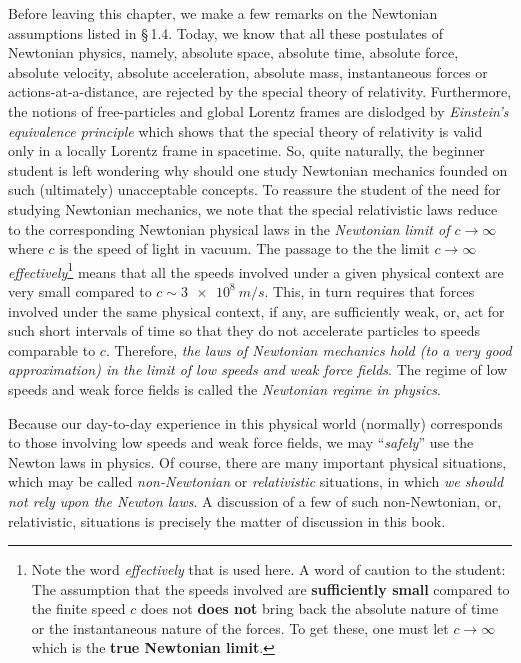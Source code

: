 Before leaving this chapter, we make a few remarks on 
the
Newtonian assumptions listed in \S\,1.4. Today, we know 
that
all these postulates of Newtonian physics, namely, 
absolute
space, absolute time, absolute force, absolute 
velocity,
absolute acceleration, absolute mass, instantaneous 
forces
or actions-at-a-distance, are rejected by the special 
theory
of relativity. Furthermore, the notions of 
free-particles
and global Lorentz frames are dislodged by
\textsl{Einstein's equivalence principle} which shows 
that
the special theory of relativity is valid only in a 
locally
Lorentz frame in spacetime. So, quite naturally, the 
beginner student is left wondering why should one 
study 
Newtonian mechanics  founded on such (ultimately) 
unacceptable concepts. To reassure the student of the 
need 
for studying Newtonian mechanics, we note that the 
special 
relativistic laws reduce to the corresponding 
Newtonian 
physical laws in the \textsl{Newtonian limit of 
$c\rightarrow \infty$ } where $c$ is the speed of light 
in 
vacuum. The passage to the the limit $c\rightarrow 
\infty$ 
\textsl{effectively}\footnote{Note the word 
\textsl{effectively} that is used here. A word of 
caution to
the student: The assumption that the speeds involved 
are
\textbf{sufficiently small} compared to the finite 
speed
$c$ does not \textbf{does not} bring back the absolute 
nature of time or the instantaneous nature of the 
forces. 
To get these, one must let $c\rightarrow \infty$ which 
is 
the \textbf{true Newtonian limit}.} means that all the 
speeds involved under a given physical context are 
very 
small compared to $c \sim \SI{3e8}{m/s}$. This, in 
turn 
requires that forces involved under the same physical 
context, if any, are sufficiently weak, or, act for 
such 
short intervals of time so that they do not accelerate 
particles to speeds comparable to $c$. Therefore, 
\textsl{the laws of Newtonian mechanics hold (to a 
very 
good approximation) in the limit of low speeds and 
weak force fields}. The regime of low speeds and weak 
force 
fields is called the \textsl{Newtonian regime in 
physics}.

Because our day-to-day experience in this physical 
world 
(normally) corresponds to those involving low speeds 
and 
weak force fields, we may ``\textsl{safely}'' use the 
Newton 
laws in physics. Of course, there are many important 
physical situations, which may be called 
\textsl{non-Newtonian} or \textsl{relativistic} 
situations, 
in which \textsl{we should not rely upon the Newton 
laws}. A 
discussion of a few of such non-Newtonian, or, 
relativistic, 
situations is precisely the matter of discussion in 
this 
book.

